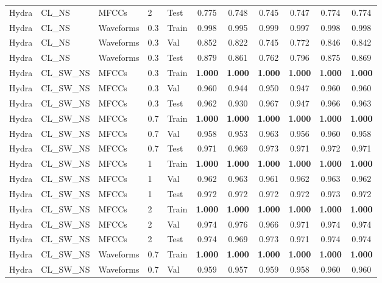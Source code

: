 \begin{landscape}
\begin{longtable}{|l|l|l|l|l|c|c|c|c|c|c|}
Hydra & CL\_NS & MFCCs & 2 & Test & 0.775 & 0.748 & 0.745 & 0.747 & 0.774 & 0.774 \\
Hydra & CL\_NS & Waveforms & 0.3 & Train & 0.998 & 0.995 & 0.999 & 0.997 & 0.998 & 0.998 \\
Hydra & CL\_NS & Waveforms & 0.3 & Val & 0.852 & 0.822 & 0.745 & 0.772 & 0.846 & 0.842 \\
Hydra & CL\_NS & Waveforms & 0.3 & Test & 0.879 & 0.861 & 0.762 & 0.796 & 0.875 & 0.869 \\
Hydra & CL\_SW\_NS & MFCCs & 0.3 & Train & \textbf{1.000} & \textbf{1.000} & \textbf{1.000} & \textbf{1.000} & \textbf{1.000} & \textbf{1.000} \\
Hydra & CL\_SW\_NS & MFCCs & 0.3 & Val & 0.960 & 0.944 & 0.950 & 0.947 & 0.960 & 0.960 \\
Hydra & CL\_SW\_NS & MFCCs & 0.3 & Test & 0.962 & 0.930 & 0.967 & 0.947 & 0.966 & 0.963 \\
Hydra & CL\_SW\_NS & MFCCs & 0.7 & Train & \textbf{1.000} & \textbf{1.000} & \textbf{1.000} & \textbf{1.000} & \textbf{1.000} & \textbf{1.000} \\
Hydra & CL\_SW\_NS & MFCCs & 0.7 & Val & 0.958 & 0.953 & 0.963 & 0.956 & 0.960 & 0.958 \\
Hydra & CL\_SW\_NS & MFCCs & 0.7 & Test & 0.971 & 0.969 & 0.973 & 0.971 & 0.972 & 0.971 \\
Hydra & CL\_SW\_NS & MFCCs & 1 & Train & \textbf{1.000} & \textbf{1.000} & \textbf{1.000} & \textbf{1.000} & \textbf{1.000} & \textbf{1.000} \\
Hydra & CL\_SW\_NS & MFCCs & 1 & Val & 0.962 & 0.963 & 0.961 & 0.962 & 0.963 & 0.962 \\
Hydra & CL\_SW\_NS & MFCCs & 1 & Test & 0.972 & 0.972 & 0.972 & 0.972 & 0.973 & 0.972 \\
Hydra & CL\_SW\_NS & MFCCs & 2 & Train & \textbf{1.000} & \textbf{1.000} & \textbf{1.000} & \textbf{1.000} & \textbf{1.000} & \textbf{1.000} \\
Hydra & CL\_SW\_NS & MFCCs & 2 & Val & 0.974 & 0.976 & 0.966 & 0.971 & 0.974 & 0.974 \\
Hydra & CL\_SW\_NS & MFCCs & 2 & Test & 0.974 & 0.969 & 0.973 & 0.971 & 0.974 & 0.974 \\
Hydra & CL\_SW\_NS & Waveforms & 0.7 & Train & \textbf{1.000} & \textbf{1.000} & \textbf{1.000} & \textbf{1.000} & \textbf{1.000} & \textbf{1.000} \\
Hydra & CL\_SW\_NS & Waveforms & 0.7 & Val & 0.959 & 0.957 & 0.959 & 0.958 & 0.960 & 0.960 \\

\end{longtable}
\end{landscape}
